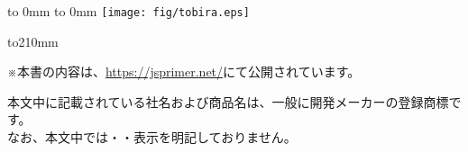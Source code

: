 \begin{comment}
%
%
\end{comment}
\thispagestyle{empty}
\vbox to 0mm{\vspace*{-24truemm}
\hbox to 0mm{
\hspace*{-26truemm}\texttt{[image: fig/tobira.eps]}
}\vss}
\pagebreak


\begin{comment}
%
%
\end{comment}

\thispagestyle{frontheadings}

\vbox to210mm{ \vfil
\vbox{
※本書の内容は、\url{https://jsprimer.net/}にて公開されています。\vspace{4mm}
}
\begin{minipage}[b]{112mm}
%
% 
\begin{spacing}{1.0}
\begin{small}
本文中に記載されている社名および商品名は、一般に開発メーカーの登録商標です。\\
なお、本文中では\texttrademark ・\textcopyright ・\textregistered 表示を明記しておりません。
\end{small}
\end{spacing}
\end{minipage}
}
